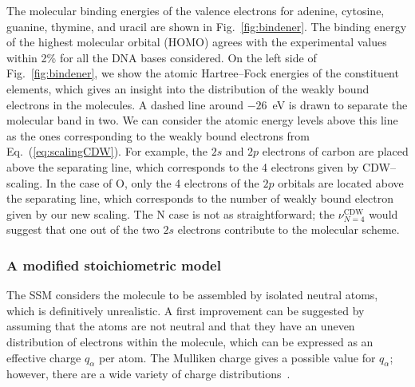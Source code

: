 \documentclass[10pt,showpacs,showkeys,twocolumn]{revtex4}
\begin{document}
The molecular binding energies of the valence electrons for adenine, 
cytosine, guanine, thymine, and uracil are shown in Fig.~\ref{fig:bindener}. 
The binding energy of the highest molecular orbital (HOMO) agrees with 
the experimental values~\cite{Hush,Verkin,Dougherty} within 
2\% for all the DNA bases considered.
On the left side of Fig.~\ref{fig:bindener}, we show 
the atomic Hartree--Fock energies of the constituent elements, which 
gives an insight into the distribution of the weakly bound electrons
in the molecules. A dashed line around $-26$~eV is drawn to separate 
the molecular band in two. 
We can consider the atomic energy levels above this line as the ones
corresponding to the weakly bound electrons from Eq.~(\ref{eq:scalingCDW}).
For example, the $2s$ and $2p$ electrons of carbon are placed above
the separating line, which corresponds to the 4 electrons given by 
CDW--scaling. In the case of O, only the 4 electrons of 
the $2p$ orbitals are located above the separating line, which 
corresponds to the number of weakly bound electron given by 
our new scaling. 
The N case is not as straightforward; the $\nu_{N=4}^{\text{CDW}}$ 
would suggest that one out of the two $2s$ electrons contribute to the 
molecular scheme.

\subsubsection{A modified stoichiometric model}

The SSM considers the molecule to be assembled by isolated neutral atoms, 
which is definitively unrealistic. A first improvement can be suggested 
by assuming that the atoms are not neutral and that they have an uneven
distribution of electrons within the molecule, which can be expressed as 
an effective charge $q_{\alpha}$ per atom. The Mulliken charge gives a 
possible value for $q_{\alpha}$; however, there are a wide variety of 
charge distributions~\cite{lee2003}.
\end{document}
